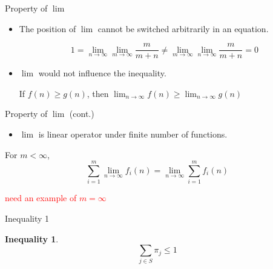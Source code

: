 \documentclass[mathserif]{beamer}
\newtheorem{ineq}{Inequality}
\begin{document}
\begin{frame}{Property of $\lim$}
	\begin{itemize}
		\item The position of $\lim$ cannot be switched arbitrarily in an equation.
			\begin{example}
				\[
				1 = \lim_{n \to \infty}\lim_{m \to \infty} \frac{m}{m+n} \neq
				\lim_{m \to \infty}\lim_{n \to \infty} \frac{m}{m+n} = 0
				\]
			\end{example}
		\item $\lim$ would not influence the inequality.
			\begin{example}
				\begin{center}
					If $f(n) \geq g(n)$, then
					$\lim_{n \to \infty} f(n) \geq \lim_{n \to \infty} g(n)$
				\end{center}
			\end{example}
	\end{itemize}
\end{frame}

\begin{frame}{Property of $\lim$ (cont.)}
	\begin{itemize}
		\item $\lim$ is linear operator under finite number of functions.
	\end{itemize}
	\begin{example}
		For $m < \infty$,
		\[
		\sum_{i=1}^m \lim_{n \to \infty} f_i(n) = \lim_{n \to \infty} \sum_{i=1}^m f_i(n)
		\]
	\end{example}
	\textcolor{red}{need an example of $m = \infty$}
\end{frame}

\begin{frame}{Inequality 1}
	\begin{ineq}
		\[
		\sum_{j \in S} \pi_j \leq 1
		\]
	\end{ineq}
\end{frame}
\end{document}
